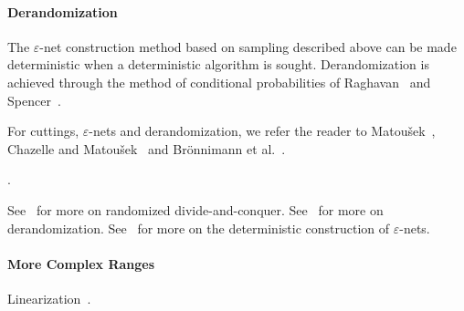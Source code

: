\paragraph{Derandomization}

The
\(\varepsilon\)-net
construction method based on sampling
described above can be made deterministic when a deterministic algorithm is
sought.
%
Derandomization is achieved through
the method of conditional probabilities of Raghavan~\cite{Rag88}
and Spencer~\cite{Spe94}.


For cuttings, $\varepsilon$-nets and derandomization, we
refer the reader to Matou\v{s}ek~\cite{M95,M96}, Chazelle and
Matou\v{s}ek~\cite{CM96} and Brönnimann et al.~\cite{BCM99}.

.


See~\cite[Section~40.1]{CMR04} for more on randomized divide-and-conquer.
See~\cite[Section~40.6]{CMR04} for more on derandomization.
See~\cite[Section~40.7]{CMR04} for more on the deterministic construction of
\(\varepsilon\)-nets.

\paragraph{More Complex Ranges}

Linearization~\cite{YY85,AM94}.

